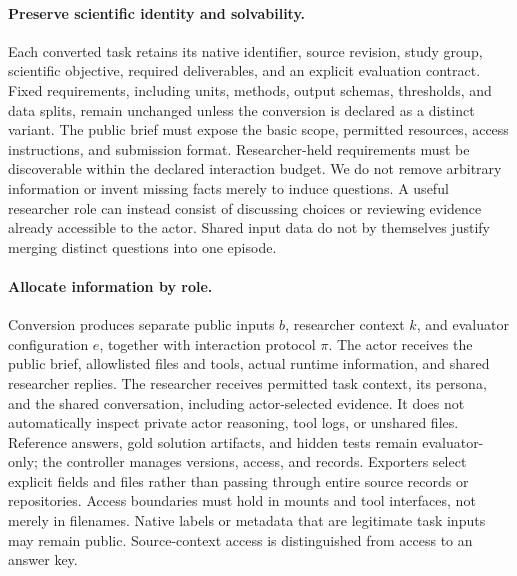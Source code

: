 \paragraph{Preserve scientific identity and solvability.}
Each converted task retains its native identifier, source revision, study
group, scientific objective, required deliverables, and an explicit
evaluation contract. Fixed requirements, including units, methods, output
schemas, thresholds, and data splits, remain unchanged unless the conversion
is declared as a distinct variant. The public brief must expose the basic
scope, permitted resources, access instructions, and submission format.
Researcher-held requirements must be discoverable within the declared
interaction budget. We do not remove arbitrary information or invent
missing facts merely to induce questions. A useful researcher role can
instead consist of discussing choices or reviewing evidence already
accessible to the actor. Shared input data do not by themselves justify
merging distinct questions into one episode.

\paragraph{Allocate information by role.}
Conversion produces separate public inputs $b$, researcher context $k$,
and evaluator configuration $e$, together with interaction protocol $\pi$.
The actor receives the public brief, allowlisted files and tools, actual
runtime information, and shared researcher replies. The researcher receives
permitted task context, its persona, and the shared conversation, including
actor-selected evidence. It does not automatically inspect private actor
reasoning, tool logs, or unshared files. Reference answers, gold solution
artifacts, and hidden tests remain evaluator-only; the controller manages
versions, access, and records. Exporters select explicit fields and files
rather than passing through entire source records or repositories. Access
boundaries must hold in mounts and tool interfaces, not merely in filenames.
Native labels or metadata that are legitimate task inputs may remain
public. Source-context access is distinguished from access to an answer key.

